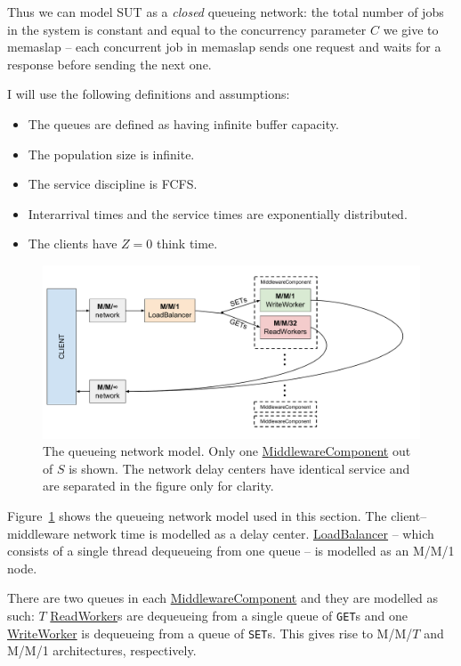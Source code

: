 \documentclass[11pt]{article}
\newcommand{\get}[0]{\texttt{GET}}
\newcommand{\set}[0]{\texttt{SET}}
\newcommand{\linkmain}[1]{\href{https://gitlab.inf.ethz.ch/pungast/asl-fall16-project/blob/master/src/main/java/asl/#1.java}{#1}}
\begin{document}
Thus we can model SUT as a \emph{closed} queueing network: the total number of jobs in the system is constant and equal to the concurrency parameter $C$ we give to memaslap -- each concurrent job in memaslap sends one request and waits for a response before sending the next one.

I will use the following definitions and assumptions:
\begin{itemize}
	\item The queues are defined as having infinite buffer capacity.
	\item The population size is infinite.
	\item The service discipline is FCFS.
	\item Interarrival times and the service times are exponentially distributed.
	\item The clients have $Z=0$ think time.
\end{itemize}

\begin{figure}[h]
\centering
\includegraphics[width=\textwidth]{figures/queueing_network}
\caption{The queueing network model. Only one \linkmain{MiddlewareComponent} out of $S$ is shown. The network delay centers have identical service and are separated in the figure only for clarity.}
\label{fig:part3:network_diagram}
\end{figure}

Figure~\ref{fig:part3:network_diagram} shows the queueing network model used in this section. The client--middleware network time is modelled as a delay center. \linkmain{LoadBalancer} -- which consists of a single thread dequeueing from one queue -- is modelled as an M/M/1 node.

There are two queues in each \linkmain{MiddlewareComponent} and they are modelled as such: $T$ \linkmain{ReadWorker}s are dequeueing from a single queue of \get{}s and one \linkmain{WriteWorker} is dequeueing from a queue of \set{}s. This gives rise to M/M/$T$ and M/M/1 architectures, respectively.
\end{document}
